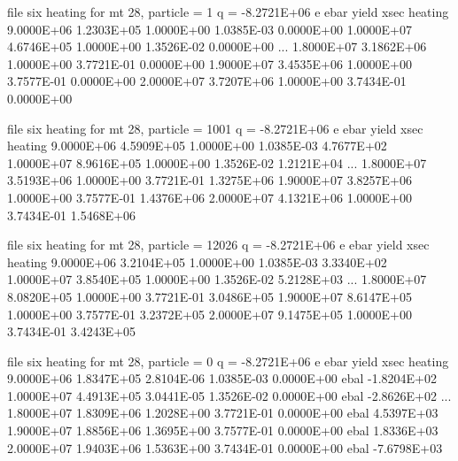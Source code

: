 \small
\begin{ccode}

 file six heating for mt 28, particle =     1     q =  -8.2721E+06
              e          ebar         yield          xsec       heating
     9.0000E+06    1.2303E+05    1.0000E+00    1.0385E-03    0.0000E+00
     1.0000E+07    4.6746E+05    1.0000E+00    1.3526E-02    0.0000E+00
     ...
     1.8000E+07    3.1862E+06    1.0000E+00    3.7721E-01    0.0000E+00
     1.9000E+07    3.4535E+06    1.0000E+00    3.7577E-01    0.0000E+00
     2.0000E+07    3.7207E+06    1.0000E+00    3.7434E-01    0.0000E+00

 file six heating for mt 28, particle =  1001     q =  -8.2721E+06
              e          ebar         yield          xsec       heating
     9.0000E+06    4.5909E+05    1.0000E+00    1.0385E-03    4.7677E+02
     1.0000E+07    8.9616E+05    1.0000E+00    1.3526E-02    1.2121E+04
     ...
     1.8000E+07    3.5193E+06    1.0000E+00    3.7721E-01    1.3275E+06
     1.9000E+07    3.8257E+06    1.0000E+00    3.7577E-01    1.4376E+06
     2.0000E+07    4.1321E+06    1.0000E+00    3.7434E-01    1.5468E+06

 file six heating for mt 28, particle = 12026     q =  -8.2721E+06
              e          ebar         yield          xsec       heating
     9.0000E+06    3.2104E+05    1.0000E+00    1.0385E-03    3.3340E+02
     1.0000E+07    3.8540E+05    1.0000E+00    1.3526E-02    5.2128E+03
     ...
     1.8000E+07    8.0820E+05    1.0000E+00    3.7721E-01    3.0486E+05
     1.9000E+07    8.6147E+05    1.0000E+00    3.7577E-01    3.2372E+05
     2.0000E+07    9.1475E+05    1.0000E+00    3.7434E-01    3.4243E+05

 file six heating for mt 28, particle =     0     q =  -8.2721E+06
              e          ebar         yield          xsec       heating
     9.0000E+06    1.8347E+05    2.8104E-06    1.0385E-03    0.0000E+00
                                                     ebal   -1.8204E+02
     1.0000E+07    4.4913E+05    3.0441E-05    1.3526E-02    0.0000E+00
                                                     ebal   -2.8626E+02
     ...
     1.8000E+07    1.8309E+06    1.2028E+00    3.7721E-01    0.0000E+00
                                                     ebal    4.5397E+03
     1.9000E+07    1.8856E+06    1.3695E+00    3.7577E-01    0.0000E+00
                                                     ebal    1.8336E+03
     2.0000E+07    1.9403E+06    1.5363E+00    3.7434E-01    0.0000E+00
                                                     ebal   -7.6798E+03

\end{ccode}
\normalsize

